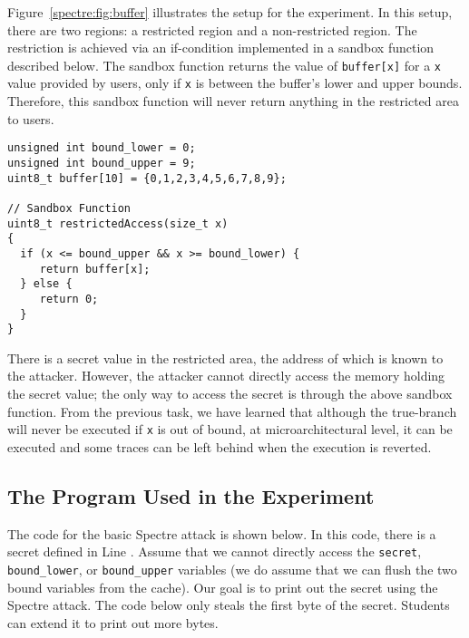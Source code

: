 Figure~\ref{spectre:fig:buffer} illustrates the setup for the experiment. 
In this setup, there are two regions: a restricted region and a non-restricted region. 
The restriction is achieved via an if-condition implemented in a sandbox function
described below. The sandbox function returns the value of \texttt{buffer[x]} for a \texttt{x} 
value provided by users, only if \texttt{x} is between the buffer's 
lower and upper bounds. 
Therefore, this sandbox function 
will never return anything in the restricted area to users.

\begin{lstlisting}
unsigned int bound_lower = 0;
unsigned int bound_upper = 9;
uint8_t buffer[10] = {0,1,2,3,4,5,6,7,8,9};

// Sandbox Function
uint8_t restrictedAccess(size_t x)
{
  if (x <= bound_upper && x >= bound_lower) {
     return buffer[x];
  } else {
     return 0;
  }
}
\end{lstlisting}


There is a secret value in the restricted area, the address of which 
is known to the attacker. However, the attacker cannot directly 
access the memory holding the secret value; the only way to access the 
secret is through the above sandbox function. From the previous task, we have learned that
although the true-branch will never be executed if \texttt{x} is out of bound, 
at microarchitectural level, it can be executed and some traces can be left behind
when the execution is reverted. 


\subsection{The Program Used in the Experiment}


The code for the basic Spectre attack is shown below. In this code, there is a
secret defined in Line . Assume that we cannot directly
access the \texttt{secret}, \texttt{bound\_lower}, or 
\texttt{bound\_upper} variables (we do assume that we
can flush the two bound variables from the cache). 
Our goal is to print out the secret
using the Spectre attack. The code below only steals the first byte of the secret. Students can
extend it to print out more bytes. 


